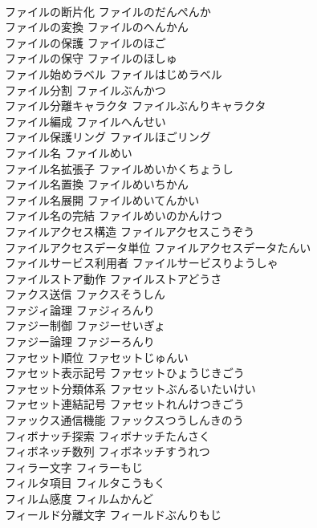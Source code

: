 \documentclass[8pt]{extreport}
\begin{document}
\begin{CJK}{UTF8}{min}
\\	ファイルの断片化	ファイルのだんぺんか	
\\	ファイルの変換	ファイルのへんかん	
\\	ファイルの保護	ファイルのほご	
\\	ファイルの保守	ファイルのほしゅ	
\\	ファイル始めラベル	ファイルはじめラベル	
\\	ファイル分割	ファイルぶんかつ	
\\	ファイル分離キャラクタ	ファイルぶんりキャラクタ	
\\	ファイル編成	ファイルへんせい	
\\	ファイル保護リング	ファイルほごリング	
\\	ファイル名	ファイルめい	
\\	ファイル名拡張子	ファイルめいかくちょうし	
\\	ファイル名置換	ファイルめいちかん	
\\	ファイル名展開	ファイルめいてんかい	
\\	ファイル名の完結	ファイルめいのかんけつ	
\\	ファイルアクセス構造	ファイルアクセスこうぞう	
\\	ファイルアクセスデータ単位	ファイルアクセスデータたんい	
\\	ファイルサービス利用者	ファイルサービスりようしゃ	
\\	ファイルストア動作	ファイルストアどうさ	
\\	ファクス送信	ファクスそうしん	
\\	ファジィ論理	ファジィろんり	
\\	ファジー制御	ファジーせいぎょ	
\\	ファジー論理	ファジーろんり	
\\	ファセット順位	ファセットじゅんい	
\\	ファセット表示記号	ファセットひょうじきごう	
\\	ファセット分類体系	ファセットぶんるいたいけい	
\\	ファセット連結記号	ファセットれんけつきごう	
\\	ファックス通信機能	ファックスつうしんきのう	
\\	フィボナッチ探索	フィボナッチたんさく	
\\	フィボネッチ数列	フィボネッチすうれつ	
\\	フィラー文字	フィラーもじ	
\\	フィルタ項目	フィルタこうもく	
\\	フィルム感度	フィルムかんど	
\\	フィールド分離文字	フィールドぶんりもじ	

\end{CJK}
\end{document}
